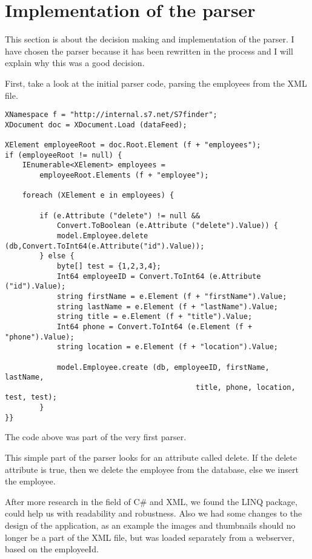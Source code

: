 \section{Implementation of the parser}
    This section is about the decision making and implementation of the parser.
    I have chosen the parser because it has been rewritten in the process and I
    will explain why this was a good decision.

    First, take a look at the initial parser code, parsing the employees from
    the XML file.
    \clearpage
    \begin{lstlisting}
XNamespace f = "http://internal.s7.net/S7finder";
XDocument doc = XDocument.Load (dataFeed);

XElement employeeRoot = doc.Root.Element (f + "employees");
if (employeeRoot != null) {
    IEnumerable<XElement> employees = 
        employeeRoot.Elements (f + "employee");

    foreach (XElement e in employees) {

        if (e.Attribute ("delete") != null && 
            Convert.ToBoolean (e.Attribute ("delete").Value)) {
            model.Employee.delete (db,Convert.ToInt64(e.Attribute("id").Value)); 
        } else {
            byte[] test = {1,2,3,4};
            Int64 employeeID = Convert.ToInt64 (e.Attribute ("id").Value);
            string firstName = e.Element (f + "firstName").Value;
            string lastName = e.Element (f + "lastName").Value;
            string title = e.Element (f + "title").Value;
            Int64 phone = Convert.ToInt64 (e.Element (f + "phone").Value);
            string location = e.Element (f + "location").Value;

            model.Employee.create (db, employeeID, firstName, lastName, 
                                            title, phone, location, test, test);    
        }
}}
    \end{lstlisting}
    The code above was part of the very first parser. 
    
    This simple part of the parser looks for an attribute called delete. If the
    delete attribute is true, then we delete the employee from the database,
    else we insert the employee.

    After more research in the field of C\# and XML, we found the LINQ package,
    could help us with readability and robustness. Also we had some changes to
    the design of the application, as an example the images and thumbnails
    should no longer be a part of the XML file, but was loaded separately from
    a webserver, based on the employeeId.

